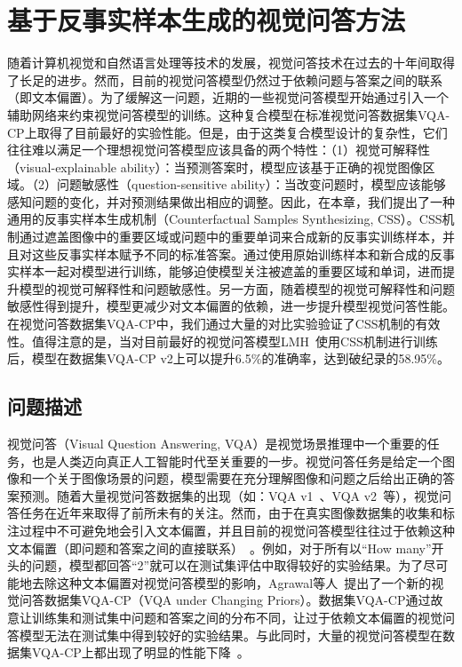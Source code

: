 \chapter{基于反事实样本生成的视觉问答方法}

随着计算机视觉和自然语言处理等技术的发展，视觉问答技术在过去的十年间取得了长足的进步。然而，目前的视觉问答模型仍然过于依赖问题与答案之间的联系（即文本偏置）。为了缓解这一问题，近期的一些视觉问答模型开始通过引入一个辅助网络来约束视觉问答模型的训练。这种复合模型在标准视觉问答数据集VQA-CP上取得了目前最好的实验性能。但是，由于这类复合模型设计的复杂性，它们往往难以满足一个理想视觉问答模型应该具备的两个特性：（1）视觉可解释性（visual-explainable ability）：当预测答案时，模型应该基于正确的视觉图像区域。（2）问题敏感性（question-sensitive ability）：当改变问题时，模型应该能够感知问题的变化，并对预测结果做出相应的调整。因此，在本章，我们提出了一种通用的反事实样本生成机制（Counterfactual Samples Synthesizing, CSS）。CSS机制通过遮盖图像中的重要区域或问题中的重要单词来合成新的反事实训练样本，并且对这些反事实样本赋予不同的标准答案。通过使用原始训练样本和新合成的反事实样本一起对模型进行训练，能够迫使模型关注被遮盖的重要区域和单词，进而提升模型的视觉可解释性和问题敏感性。另一方面，随着模型的视觉可解释性和问题敏感性得到提升，模型更减少对文本偏置的依赖，进一步提升模型视觉问答性能。在视觉问答数据集VQA-CP中，我们通过大量的对比实验验证了CSS机制的有效性。值得注意的是，当对目前最好的视觉问答模型LMH~\cite{clark2019don}使用CSS机制进行训练后，模型在数据集VQA-CP v2上可以提升6.5\%的准确率，达到破纪录的58.95\%。

\section{问题描述} \label{ch7:sec:introduction}
视觉问答（Visual Question Answering, VQA）是视觉场景推理中一个重要的任务，也是人类迈向真正人工智能时代至关重要的一步。视觉问答任务是给定一个图像和一个关于图像场景的问题，模型需要在充分理解图像和问题之后给出正确的答案预测。随着大量视觉问答数据集的出现（如：VQA v1~\cite{antol2015vqa}、VQA v2~\cite{goyal2017making}等），视觉问答任务在近年来取得了前所未有的关注。然而，由于在真实图像数据集的收集和标注过程中不可避免地会引入文本偏置，并且目前的视觉问答模型往往过于依赖这种文本偏置（即问题和答案之间的直接联系）~\cite{agrawal2016analyzing,zhang2016yin,johnson2017clevr,goyal2017making}。例如，对于所有以“How many”开头的问题，模型都回答“2”就可以在测试集评估中取得较好的实验结果。为了尽可能地去除这种文本偏置对视觉问答模型的影响，Agrawal等人~\cite{agrawal2018don}提出了一个新的视觉问答数据集VQA-CP（VQA under Changing Priors）。数据集VQA-CP通过故意让训练集和测试集中问题和答案之间的分布不同，让过于依赖文本偏置的视觉问答模型无法在测试集中得到较好的实验结果。与此同时，大量的视觉问答模型在数据集VQA-CP上都出现了明显的性能下降~\cite{andreas2016neural,fukui2016multimodal,yang2016stacked,anderson2018bottom}。


